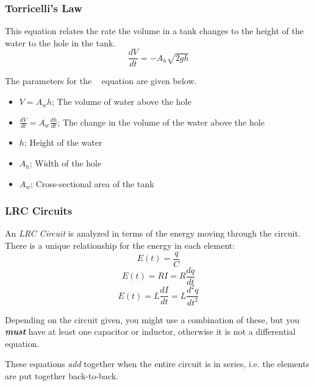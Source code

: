 \subsubsection{Torricelli's Law} \label{subsubsec:Torricelli's Law}
\begin{definition} \label{def:Torricelli's Law}
  This equation relates the rate the volume in a tank changes to the height of the water to the hole in the tank.
  \begin{equation} \label{eq:Torricelli's Law}
    \frac{dV}{dt} = -A_{h} \sqrt{2gh}
  \end{equation}
  \begin{remark}
    The parameters for the ~ equation are given below.
    \begin{itemize}[noitemsep, nolistsep]
    \item $V = A_{w}h$; The volume of water above the hole
    \item $\frac{dV}{dt} = A_{w} \frac{dh}{dt}$; The change in the volume of the water above the hole
    \item $h$; Height of the water
    \item $A_{h}$; Width of the hole
    \item $A_{w}$; Cross-sectional area of the tank
    \end{itemize}
  \end{remark}
\end{definition}

\subsubsection{LRC Circuits} \label{subsubsec:LRC Circuits}
\begin{definition} \label{def:LRC Circuits}
  An \emph{LRC Circuit} is analyzed in terms of the energy moving through the circuit.
  There is a unique relationship for the energy in each element:
  \begin{equation} \label{eq:Energy in Capacitor}
    E \left( t \right) = \frac{q}{C}
  \end{equation}
  \begin{equation} \label{eq:Energy in Resistor}
    E \left( t \right) = RI = R \frac{dq}{dt}
  \end{equation}
  \begin{equation} \label{eq:Energy in Inductor}
    E \left( t \right) = L \frac{dI}{dt} = L \frac{d^{2}q}{dt^{2}}
  \end{equation}
  \begin{remark}
    Depending on the circuit given, you might use a combination of these, but you \emph{\textbf{must}} have at least one capacitor or inductor, otherwise it is not a differential equation.
  \end{remark}
  \begin{remark}
    These equations \emph{add} together when the entire circuit is in series, i.e. the elements are put together back-to-back.
  \end{remark}
\end{definition}

